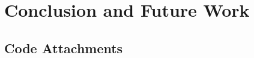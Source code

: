\documentclass[a4paper,12pt,oneside]{book}
\begin{document}
\chapter{Conclusion and Future Work}







\begin{appendices}
  \chapter{Code Attachments}
  
\end{appendices}
\end{document}
